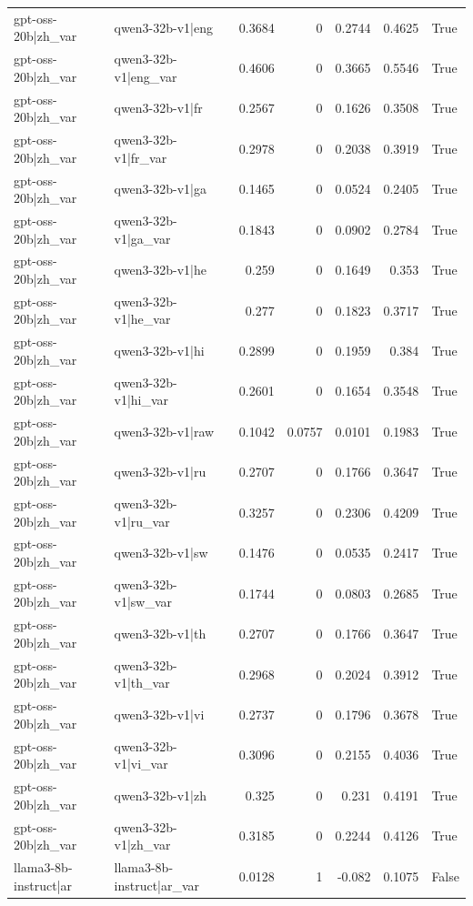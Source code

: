 \begin{table}
\begin{tabular}{l l r r r r l}
gpt-oss-20b|zh_var & qwen3-32b-v1|eng & 0.3684 & 0 & 0.2744 & 0.4625 & True \\
gpt-oss-20b|zh_var & qwen3-32b-v1|eng_var & 0.4606 & 0 & 0.3665 & 0.5546 & True \\
gpt-oss-20b|zh_var & qwen3-32b-v1|fr & 0.2567 & 0 & 0.1626 & 0.3508 & True \\
gpt-oss-20b|zh_var & qwen3-32b-v1|fr_var & 0.2978 & 0 & 0.2038 & 0.3919 & True \\
gpt-oss-20b|zh_var & qwen3-32b-v1|ga & 0.1465 & 0 & 0.0524 & 0.2405 & True \\
gpt-oss-20b|zh_var & qwen3-32b-v1|ga_var & 0.1843 & 0 & 0.0902 & 0.2784 & True \\
gpt-oss-20b|zh_var & qwen3-32b-v1|he & 0.259 & 0 & 0.1649 & 0.353 & True \\
gpt-oss-20b|zh_var & qwen3-32b-v1|he_var & 0.277 & 0 & 0.1823 & 0.3717 & True \\
gpt-oss-20b|zh_var & qwen3-32b-v1|hi & 0.2899 & 0 & 0.1959 & 0.384 & True \\
gpt-oss-20b|zh_var & qwen3-32b-v1|hi_var & 0.2601 & 0 & 0.1654 & 0.3548 & True \\
gpt-oss-20b|zh_var & qwen3-32b-v1|raw & 0.1042 & 0.0757 & 0.0101 & 0.1983 & True \\
gpt-oss-20b|zh_var & qwen3-32b-v1|ru & 0.2707 & 0 & 0.1766 & 0.3647 & True \\
gpt-oss-20b|zh_var & qwen3-32b-v1|ru_var & 0.3257 & 0 & 0.2306 & 0.4209 & True \\
gpt-oss-20b|zh_var & qwen3-32b-v1|sw & 0.1476 & 0 & 0.0535 & 0.2417 & True \\
gpt-oss-20b|zh_var & qwen3-32b-v1|sw_var & 0.1744 & 0 & 0.0803 & 0.2685 & True \\
gpt-oss-20b|zh_var & qwen3-32b-v1|th & 0.2707 & 0 & 0.1766 & 0.3647 & True \\
gpt-oss-20b|zh_var & qwen3-32b-v1|th_var & 0.2968 & 0 & 0.2024 & 0.3912 & True \\
gpt-oss-20b|zh_var & qwen3-32b-v1|vi & 0.2737 & 0 & 0.1796 & 0.3678 & True \\
gpt-oss-20b|zh_var & qwen3-32b-v1|vi_var & 0.3096 & 0 & 0.2155 & 0.4036 & True \\
gpt-oss-20b|zh_var & qwen3-32b-v1|zh & 0.325 & 0 & 0.231 & 0.4191 & True \\
gpt-oss-20b|zh_var & qwen3-32b-v1|zh_var & 0.3185 & 0 & 0.2244 & 0.4126 & True \\
llama3-8b-instruct|ar & llama3-8b-instruct|ar_var & 0.0128 & 1 & -0.082 & 0.1075 & False \\

\end{tabular}
\end{table}
